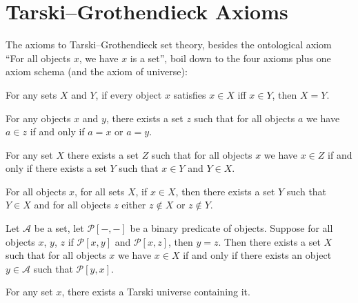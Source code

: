 \section{Tarski--Grothendieck Axioms}\label{sec:set:tarski-grothendieck}

\begin{node}[Axioms]\label{tg-0003}%
The axioms to Tarski--Grothendieck set theory, besides the ontological
axiom ``For all objects $x$, we have $x$ is a set'', boil down to the
four axioms plus one axiom schema (and the axiom of universe):

\begin{node}\label{tg-0004}%
For any sets $X$ and $Y$, if every object $x$ satisfies $x\in X$ iff
$x\in Y$, then $X=Y$.
\end{node}

\begin{node}\label{tg-0005}%
For any objects $x$ and $y$, there exists a set $z$ such that for all
objects $a$ we have $a\in z$ if and only if $a=x$ or $a=y$.
\end{node}

\begin{node}\label{tg-0006}%
For any set $X$ there exists a set $Z$ such that for all objects $x$ we
have $x\in Z$ if and only if there exists a set $Y$ such that $x\in Y$
and $Y\in X$.
\end{node}

\begin{node}\label{tg-0007}%
For all objects $x$, for all sets $X$, if $x\in X$, then there exists a
set $Y$ such that $Y\in X$ and for all objects $z$ either $z\notin X$ or
$z\notin Y$.
\end{node}

\begin{node}\label{tg-0008}%
Let $\mathcal{A}$ be a set, let $\mathcal{P}[-,-]$ be a binary predicate
of objects. Suppose for all objects $x$, $y$, $z$ if $\mathcal{P}[x,y]$ and
$\mathcal{P}[x,z]$, then $y=z$.
Then there exists a set $X$ such that for all objects $x$ we have $x\in X$
if and only if there exists an object $y\in\mathcal{A}$ such that $\mathcal{P}[y,x]$.
\end{node}

\begin{node}\label{tg-0009}%
For any set $x$, there exists a Tarski universe containing it.
\end{node}
\end{node}

